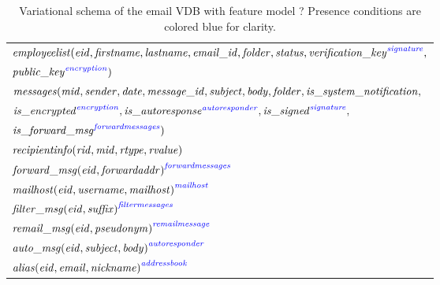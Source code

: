 \begin{table}
\caption{Variational schema of the email VDB with feature model ?
Presence conditions are colored blue for clarity.
}
\label{tab:enron-vsch}
\centering
\small
\begin{tabular}{| l |}
\hline
$\employees(\eid,\fname,\lname,\emailid,\folder,\status,
 \annot[\fsignature]{\verificationkey},$\\
\hspace{60pt} $  \annot[\fencryption]{\publickey})$ \\
$\messages(\midatt, \sender, \dateatt, \messageid, \subject, \body, \folder,
  \issystemnotification,$\\
\hspace{44pt}  $  \annot[\fencryption]{\isencrypted},
\annot[\fautoresponder]{\isautoresponse},\annot[\fsignature]{\issigned},$\\
\hspace{44pt} $  \annot[\fforwardmsg]{\isforwardmsg})$\\
$\recipientinfo(\rid, \midatt, \rtype, \rvalue)$ \\
${\forwardmsg(\eid, \forwardaddr)}^{\fforwardmsg}$ \\
${\mailhost(\eid, \username, \mailhost)}^{\fmailhost}$\\
${\filtermsg(\eid, \suffix)}^{\ffiltermsg}$\\
${\remailmsg(\eid, \pseudonym)}^{\fremailmsg}$\\
${\automsg(\eid, \subject, \body)}^{\fautoresponder}$\\
${\alias(\eid, \emailAtt, \nickname)}^{\faddressbook}$\\
\hline
\end{tabular}
\end{table}

